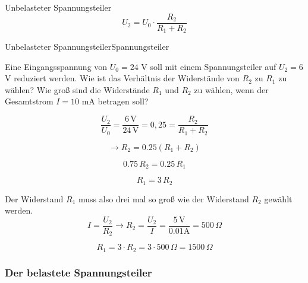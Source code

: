\begin{frame}
{		\begin{Merksatz}{Unbelasteter Spannungsteiler}
			\begin{equation}
				U_2 = U_0 \cdot \frac{R_2}{R_1+R_2}
			\end{equation}
		\end{Merksatz}
		
		
		\begin{bsp}{Unbelasteter Spannungsteiler}{Spannungsteiler}
			
			Eine Eingangsspannung von $U_0 = 24$ V soll mit einem Spannungsteiler auf $U_2 = 6$ V reduziert werden.
			Wie ist das Verhältnis der Widerstände von $R_2$ zu $R_1$ zu wählen?
			Wie groß sind die Widerstände $R_1$ und $R_2$ zu wählen, wenn der Gesamtstrom $I = 10$ mA betragen soll?
			
			\begin{equation*}
				\frac{U_2}{U_0} = \frac{6 \, \mathrm{V}}{24 \, \mathrm{V}} = 0,25 = \frac{R_2}{R_1+R_2}
			\end{equation*}
			
			\begin{equation*}
				\rightarrow R_2 = 0.25 (R_1+R_2)  
			\end{equation*}
			
			\begin{equation*}
				0.75 \, R_2 = 0.25 \, R_1
			\end{equation*}
			
			\begin{equation*}
				R_1 = 3 \, R_2
			\end{equation*}
			
			
			Der Widerstand $R_1$ muss also drei mal so groß wie der Widerstand $R_2$ gewählt werden.\\
			
			
			
			\begin{equation*}
				I = \frac{U_2}{R_2} \rightarrow R_2 = \frac{U_2}{I} = \frac{5 \, \mathrm{V}}{0.01 \mathrm{A}} = 500 \, \Omega
			\end{equation*}
			
			\begin{equation*}
				R_1 = 3 \cdot R_2 = 3 \cdot 500 \, \Omega = 1500 \, \Omega
			\end{equation*}
			
			
			
			
			
		\end{bsp}
		
		\subsubsection{Der belastete Spannungsteiler}
		
}
\end{frame}
